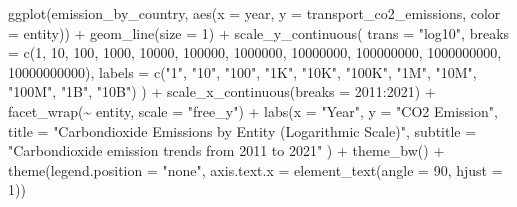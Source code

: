 \documentclass[
  11pt,
  a4paper,
  DIV=11,
  numbers=noendperiod]{scrartcl}
\newenvironment{Shaded}{\begin{snugshade}}{\end{snugshade}}
\newcommand{\AttributeTok}[1]{\textcolor[rgb]{0.40,0.45,0.13}{#1}}
\newcommand{\DecValTok}[1]{\textcolor[rgb]{0.68,0.00,0.00}{#1}}
\newcommand{\FunctionTok}[1]{\textcolor[rgb]{0.28,0.35,0.67}{#1}}
\newcommand{\NormalTok}[1]{\textcolor[rgb]{0.00,0.23,0.31}{#1}}
\newcommand{\SpecialCharTok}[1]{\textcolor[rgb]{0.37,0.37,0.37}{#1}}
\newcommand{\StringTok}[1]{\textcolor[rgb]{0.13,0.47,0.30}{#1}}
\begin{document}
\begin{Shaded}
\begin{Highlighting}[]
\FunctionTok{ggplot}\NormalTok{(emission\_by\_country, }\FunctionTok{aes}\NormalTok{(}\AttributeTok{x =}\NormalTok{ year, }\AttributeTok{y =}\NormalTok{ transport\_co2\_emissions, }\AttributeTok{color =}\NormalTok{ entity)) }\SpecialCharTok{+}
  \FunctionTok{geom\_line}\NormalTok{(}\AttributeTok{size =} \DecValTok{1}\NormalTok{) }\SpecialCharTok{+}
  \FunctionTok{scale\_y\_continuous}\NormalTok{(}
    \AttributeTok{trans =} \StringTok{"log10"}\NormalTok{,}
    \AttributeTok{breaks =} \FunctionTok{c}\NormalTok{(}\DecValTok{1}\NormalTok{, }\DecValTok{10}\NormalTok{, }\DecValTok{100}\NormalTok{, }\DecValTok{1000}\NormalTok{, }\DecValTok{10000}\NormalTok{, }\DecValTok{100000}\NormalTok{, }\DecValTok{1000000}\NormalTok{, }\DecValTok{10000000}\NormalTok{, }\DecValTok{100000000}\NormalTok{, }\DecValTok{1000000000}\NormalTok{, }\DecValTok{10000000000}\NormalTok{),}
    \AttributeTok{labels =} \FunctionTok{c}\NormalTok{(}\StringTok{"1"}\NormalTok{, }\StringTok{"10"}\NormalTok{, }\StringTok{"100"}\NormalTok{, }\StringTok{"1K"}\NormalTok{, }\StringTok{"10K"}\NormalTok{, }\StringTok{"100K"}\NormalTok{, }\StringTok{"1M"}\NormalTok{, }\StringTok{"10M"}\NormalTok{, }\StringTok{"100M"}\NormalTok{, }\StringTok{"1B"}\NormalTok{, }\StringTok{"10B"}\NormalTok{)}
\NormalTok{  ) }\SpecialCharTok{+}
  \FunctionTok{scale\_x\_continuous}\NormalTok{(}\AttributeTok{breaks =} \DecValTok{2011}\SpecialCharTok{:}\DecValTok{2021}\NormalTok{) }\SpecialCharTok{+}
  \FunctionTok{facet\_wrap}\NormalTok{(}\SpecialCharTok{\textasciitilde{}}\NormalTok{ entity, }\AttributeTok{scale =} \StringTok{"free\_y"}\NormalTok{) }\SpecialCharTok{+}
  \FunctionTok{labs}\NormalTok{(}\AttributeTok{x =} \StringTok{"Year"}\NormalTok{, }
       \AttributeTok{y =} \StringTok{"CO2 Emission"}\NormalTok{,}
       \AttributeTok{title =} \StringTok{"Carbondioxide Emissions by Entity (Logarithmic Scale)"}\NormalTok{,}
       \AttributeTok{subtitle =} \StringTok{"Carbondioxide emission trends from 2011 to 2021"}
\NormalTok{       ) }\SpecialCharTok{+}
  \FunctionTok{theme\_bw}\NormalTok{() }\SpecialCharTok{+}
  \FunctionTok{theme}\NormalTok{(}\AttributeTok{legend.position =} \StringTok{"none"}\NormalTok{,}
        \AttributeTok{axis.text.x =} \FunctionTok{element\_text}\NormalTok{(}\AttributeTok{angle =} \DecValTok{90}\NormalTok{, }\AttributeTok{hjust =} \DecValTok{1}\NormalTok{))}
\end{Highlighting}
\end{Shaded}
\end{document}
